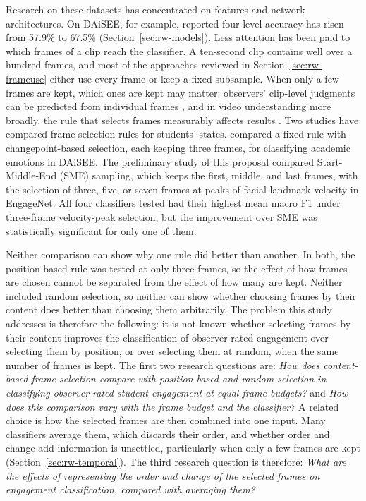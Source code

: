 Research on these datasets has concentrated on features and network architectures. On DAiSEE, for example, reported four-level accuracy has risen from 57.9\% to 67.5\% (Section~\ref{sec:rw-models}). Less attention has been paid to which frames of a clip reach the classifier. A ten-second clip contains well over a hundred frames, and most of the approaches reviewed in Section~\ref{sec:rw-frameuse} either use every frame or keep a fixed subsample. When only a few frames are kept, which ones are kept may matter: observers' clip-level judgments can be predicted from individual frames \cite{whitehill2014}, and in video understanding more broadly, the rule that selects frames measurably affects results \cite{korbar2019,brkic2025}. Two studies have compared frame selection rules for students' states.  compared a fixed rule with changepoint-based selection, each keeping three frames, for classifying academic emotions in DAiSEE. The preliminary study of this proposal \cite{sityar2026icce} compared Start-Middle-End (SME) sampling, which keeps the first, middle, and last frames, with the selection of three, five, or seven frames at peaks of facial-landmark velocity in EngageNet. All four classifiers tested had their highest mean macro F1 under three-frame velocity-peak selection, but the improvement over SME was statistically significant for only one of them.

Neither comparison can show why one rule did better than another. In both, the position-based rule was tested at only three frames, so the effect of how frames are chosen cannot be separated from the effect of how many are kept. Neither included random selection, so neither can show whether choosing frames by their content does better than choosing them arbitrarily. The problem this study addresses is therefore the following: it is not known whether selecting frames by their content improves the classification of observer-rated engagement over selecting them by position, or over selecting them at random, when the same number of frames is kept. The first two research questions are: \emph{How does content-based frame selection compare with position-based and random selection in classifying observer-rated student engagement at equal frame budgets?} and \emph{How does this comparison vary with the frame budget and the classifier?} A related choice is how the selected frames are then combined into one input. Many classifiers average them, which discards their order, and whether order and change add information is unsettled, particularly when only a few frames are kept (Section~\ref{sec:rw-temporal}). The third research question is therefore: \emph{What are the effects of representing the order and change of the selected frames on engagement classification, compared with averaging them?}


